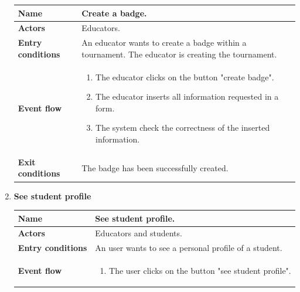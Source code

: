 \begin{enumerate}[label=\textbf{UC.\arabic*}]
\begin{table}[H]
    	    \centering
                \renewcommand{\arraystretch}{1.5}
                \begin{tabular}{|m{3.2cm}|m{9.8cm}|}
                    \hline
                    \textbf{Name} & Create a badge. \\
                    \hline
                    \textbf{Actors} & Educators. \\
                    \hline
                    \textbf{Entry conditions}  & An educator wants to create a badge within a tournament. The educator is creating the tournament. \\
                    \hline
                    \textbf{Event flow}  & 
                    \begin{enumerate}[label=\arabic*.]
                        \item The educator clicks on the button "create badge".
                        \item The educator inserts all information requested in a form.
                        \item The system check the correctness of the inserted information.
                    \end{enumerate}\\ 
                    \hline
                    \textbf{Exit conditions}  & The badge has been successfully created. \\
                    \hline
                \end{tabular}
        \end{table}
        \item {} \textbf{See student profile}
        \begin{table}[H]
    	    \centering
                \renewcommand{\arraystretch}{1.5}
                \begin{tabular}{|m{3.2cm}|m{9.8cm}|}
                    \hline
                    \textbf{Name} & See student profile. \\
                    \hline
                    \textbf{Actors} & Educators and students. \\
                    \hline
                    \textbf{Entry conditions}  & An user wants to see a personal profile of a student. \\
                    \hline
                    \textbf{Event flow}  & 
                    \begin{enumerate}[label=\arabic*.]
                        \item The user clicks on the button "see student profile".

\end{enumerate}
\end{tabular}
\end{table}
\end{enumerate}
